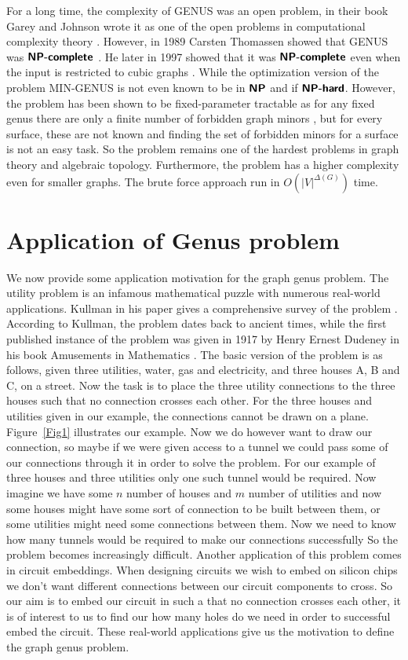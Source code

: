 \documentclass{article}
\newcommand{\classX}[1]{\ensuremath{\text{\textsf{\textbf{#1}}}}}
\newcommand{\classNP}{\classX{NP}}
\newcommand{\NPC}{\classX{NP-complete}}
\newcommand{\NPH}{\classX{NP-hard}}
\begin{document}
    For a long time, the complexity of GENUS was an open problem, in their book Garey and Johnson wrote it as one of the open problems in computational complexity theory \cite{GareyJohnson90}. 
    However, in 1989 Carsten Thomassen showed that GENUS was $\NPC$ \cite{Thomassen89}. He later in 1997 showed that it was $\NPC$ even when the input is restricted to cubic graphs \cite{Thomassen97}.
    While the optimization version of the problem MIN-GENUS is not even known to be in $\classNP$ and if $\NPH$. However, the problem has been shown to be fixed-parameter tractable as for any fixed genus there are only a finite number of forbidden graph minors \cite{Beyer16}, but for every surface, these are not known and finding the set of forbidden minors for a surface is not an easy task.
    So the problem remains one of the hardest problems in graph theory and algebraic topology.
    Furthermore, the problem has a higher complexity even for smaller graphs. The brute force approach run in $O(|V|^{\Delta(G)})$ time.

\section{Application of Genus problem}
    We now provide some application motivation for the graph genus problem.
    The utility problem is an infamous mathematical puzzle with numerous real-world applications. Kullman in his paper gives a comprehensive survey of the problem \cite{Kullman79}.
    According to Kullman, the problem dates back to ancient times, while the first published instance of the problem was given in 1917 by Henry Ernest Dudeney in his book Amusements in Mathematics \cite{Dudeney17, Kullman79}.
    The basic version of the problem is as follows, given three utilities, water, gas and electricity, and three houses A, B and C, on a street. 
    Now the task is to place the three utility connections to the three houses such that no connection crosses each other. For the three houses and utilities given in our example, the connections cannot be drawn on a plane.
    Figure~\ref*{Fig1} illustrates our example. Now we do however want to draw our connection, so maybe if we were given access to a tunnel we could pass some of our connections through it in order to solve the problem.
    For our example of three houses and three utilities only one such tunnel would be required. Now imagine we have some $n$ number of houses and $m$ number of utilities and now some houses might have some sort of connection to be built between them, or some utilities might need some connections between them.
    Now we need to know how many tunnels would be required to make our connections successfully
    So the problem becomes increasingly difficult. Another application of this problem comes in circuit embeddings. 
    When designing circuits we wish to embed on silicon chips we don't want different connections between our circuit components to cross. So our aim is to embed our circuit in such a that no connection crosses each other, it is of interest to us to find our how many holes do we need in order to successful embed the circuit.
    These real-world applications give us the motivation to define the graph genus problem. 
    
\end{document}
